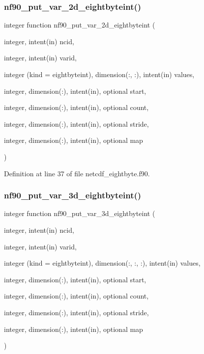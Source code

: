 \subsubsection{\texorpdfstring{nf90\+\_\+put\+\_\+var\+\_\+2d\+\_\+eightbyteint()}{nf90\_put\_var\_2d\_eightbyteint()}}
{\footnotesize\ttfamily integer function nf90\+\_\+put\+\_\+var\+\_\+2d\+\_\+eightbyteint (\begin{DoxyParamCaption}\item[{integer, intent(in)}]{ncid,  }\item[{integer, intent(in)}]{varid,  }\item[{integer (kind = eightbyteint), dimension(\+:, \+:), intent(in)}]{values,  }\item[{integer, dimension(\+:), intent(in), optional}]{start,  }\item[{integer, dimension(\+:), intent(in), optional}]{count,  }\item[{integer, dimension(\+:), intent(in), optional}]{stride,  }\item[{integer, dimension(\+:), intent(in), optional}]{map }\end{DoxyParamCaption})}



Definition at line 37 of file netcdf\+\_\+eightbyte.\+f90.

\mbox{\label{netcdf__eightbyte_8f90_a8cc31a27809898ae558570386d71fd3c}} 
\subsubsection{\texorpdfstring{nf90\+\_\+put\+\_\+var\+\_\+3d\+\_\+eightbyteint()}{nf90\_put\_var\_3d\_eightbyteint()}}
{\footnotesize\ttfamily integer function nf90\+\_\+put\+\_\+var\+\_\+3d\+\_\+eightbyteint (\begin{DoxyParamCaption}\item[{integer, intent(in)}]{ncid,  }\item[{integer, intent(in)}]{varid,  }\item[{integer (kind = eightbyteint), dimension(\+:, \+:, \+:), intent(in)}]{values,  }\item[{integer, dimension(\+:), intent(in), optional}]{start,  }\item[{integer, dimension(\+:), intent(in), optional}]{count,  }\item[{integer, dimension(\+:), intent(in), optional}]{stride,  }\item[{integer, dimension(\+:), intent(in), optional}]{map }\end{DoxyParamCaption})}



